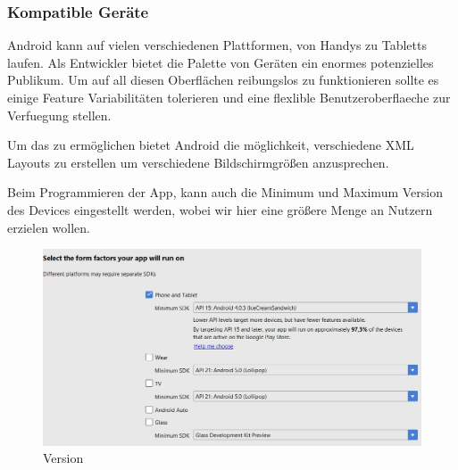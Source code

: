 \subsubsection{Kompatible Geräte}
\label{subsec:device-compability}

Android kann auf vielen verschiedenen Plattformen, von Handys zu Tabletts laufen.
Als Entwickler bietet die Palette von Geräten ein enormes potenzielles Publikum.
Um auf all diesen Oberflächen reibungslos zu funktionieren sollte es einige Feature Variabilitäten tolerieren und eine 
flexlible Benutzeroberflaeche zur Verfuegung stellen. 

Um das zu ermöglichen bietet Android die möglichkeit, verschiedene XML Layouts zu erstellen um verschiedene Bildschirmgrößen anzusprechen.

Beim Programmieren der App, kann auch die Minimum und Maximum Version des Devices eingestellt werden, wobei wir hier eine größere Menge an Nutzern erzielen wollen. 

\begin{figure}[!htb]\centering
	\includegraphics[width=1.0 \textwidth]{images/MinMaxVers}
	\caption{Version}\label{Fig:Version}
\end{figure}



\clearpage %
